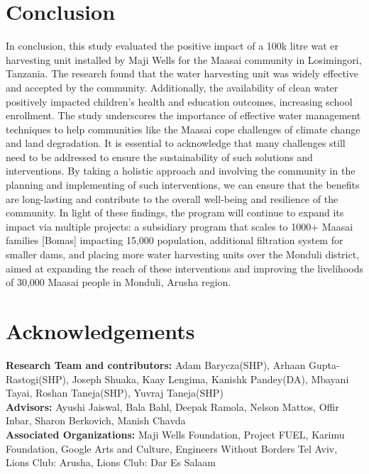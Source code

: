 \documentclass[10pt, twocolumn]{article}
\begin{document}
\section{Conclusion}

In conclusion, this study evaluated the positive impact of a 100k litre wat er harvesting unit installed by Maji Wells for the Maasai community in Losimingori, Tanzania. The research found that the water harvesting unit was widely effective and accepted by the community. Additionally, the availability of clean water positively impacted children's health and education outcomes, increasing school enrollment. The study underscores the importance of effective water management techniques to help communities like the Maasai cope challenges of climate change and land degradation. It is essential to acknowledge that many challenges still need to be addressed to ensure the sustainability of such solutions and interventions. By taking a holistic approach and involving the community in the planning and implementing of such interventions, we can ensure that the benefits are long-lasting and contribute to the overall well-being and resilience of the community. In light of these findings, the program will continue to expand its impact via multiple projects: a subsidiary program that scales to 1000+ Maasai families [Bomas] impacting 15,000 population, additional filtration system for smaller dams, and placing more water harvesting units over the Monduli  district, aimed at expanding the reach of these interventions and improving the livelihoods of 30,000 Maasai people in Monduli, Arusha region.















\section*{Acknowledgements}

\textbf{Research Team and contributors:} Adam Barycza(SHP), Arhaan Gupta-Rastogi(SHP), Joseph Shuaka, Kaay Lengima, Kanishk Pandey(DA), Mbayani Tayai, Roshan Taneja(SHP), Yuvraj Taneja(SHP)
\\ \newline
\textbf{Advisors:} Ayushi Jaiswal, Bala Bahl, Deepak Ramola, Nelson Mattos, Offir Inbar, Sharon Berkovich, Manish Chavda
\\ \newline
\textbf{Associated Organizations:} Maji Wells Foundation, Project FUEL, Karimu Foundation, Google Arts and Culture, Engineers Without Borders Tel Aviv, Lions Club: Arusha, Lions Club: Dar Es Salaam
\end{document}
